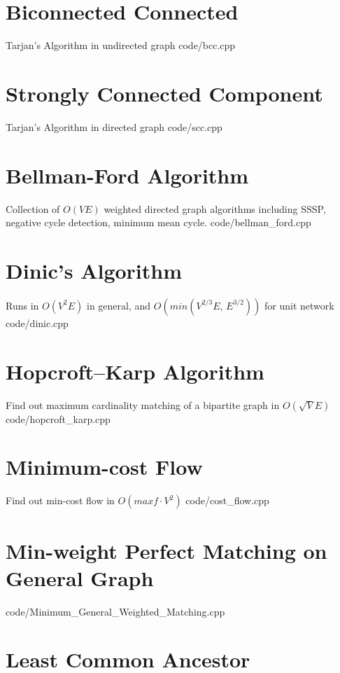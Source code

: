 \documentclass [landscape,8pt,a4paper,twocolumn]{article}
\begin{document}
\section{Biconnected Connected}
Tarjan's Algorithm in undirected graph
 {code/bcc.cpp}

\section{Strongly Connected Component}
Tarjan's Algorithm in directed graph
 {code/scc.cpp}

\section{Bellman-Ford Algorithm}
Collection of $ O(VE) $ weighted directed graph algorithms including SSSP, negative cycle detection, minimum mean cycle.
 {code/bellman_ford.cpp}

\vfill\null

\section{Dinic's Algorithm}
Runs in $ O(V^2E) $ in general, and $ O(min(V^{2/3}E,\, E^{3/2})) $ for unit network
 {code/dinic.cpp}

\section{Hopcroft–Karp Algorithm}
Find out maximum cardinality matching of a bipartite graph in $ O(\sqrt{V}E) $
 {code/hopcroft_karp.cpp}

\section{Minimum-cost Flow}
Find out min-cost flow in $ O(maxf \cdot V^2) $
 {code/cost_flow.cpp}

\section{Min-weight Perfect Matching on General Graph}
 {code/Minimum_General_Weighted_Matching.cpp}

\section{Least Common Ancestor}
\end{document}
